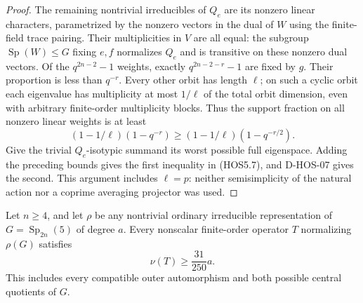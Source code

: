 \begin{proof}
The remaining nontrivial irreducibles of $Q_e$ are its nonzero
linear characters, parametrized by the nonzero vectors in the
dual of $W$ using the finite-field trace pairing. Their
multiplicities in $V$ are all equal: the subgroup
$\operatorname{Sp}(W)\le G$ fixing $e,f$ normalizes $Q_e$ and is
transitive on these nonzero dual vectors. Of the $q^{2n-2}-1$
weights, exactly $q^{2n-2-r}-1$ are fixed by $g$. Their proportion
is less than $q^{-r}$. Every other orbit has length $\ell$;
on such a cyclic orbit each eigenvalue has multiplicity at most
$1/\ell$ of the total orbit dimension, even with arbitrary
finite-order multiplicity blocks. Thus the support fraction on
all nonzero linear weights is at least
\[
                (1-1/\ell)(1-q^{-r})
                 \ge(1-1/\ell)(1-q^{-r/2}).
\]
Give the trivial $Q_e$-isotypic summand its worst possible full
eigenspace. Adding the preceding bounds gives the first inequality
in (HOS5.7), and D-HOS-07 gives the second. This argument includes
$\ell=p$: neither semisimplicity of the natural action nor a
coprime averaging projector was used.
\end{proof}

\begin{lemma}
\label{D-HOS-09}
Let $n\ge4$, and let $\rho$ be any nontrivial ordinary irreducible
representation of $G=\operatorname{Sp}_{2n}(5)$ of degree $a$.
Every nonscalar finite-order operator $T$ normalizing $\rho(G)$
satisfies
\[
                          \nu(T)\ge\frac{31}{250}a.           \tag{HOS5.11}
\]
This includes every compatible outer automorphism and both possible
central quotients of $G$.
\end{lemma}

